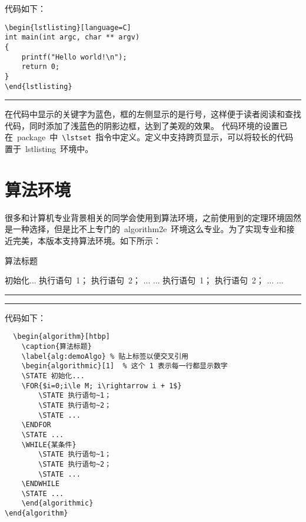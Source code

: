 \noindent 代码如下：
\begin{verbatim}
\begin{lstlisting}[language=C]
int main(int argc, char ** argv)
{
	printf("Hello world!\n");
	return 0;
}
\end{lstlisting}
\end{verbatim}
\noindent\hrule\vspace{1em}

在代码中显示的关键字为蓝色，框的左侧显示的是行号，这样便于读者阅读和查找代码，同时添加了浅蓝色的阴影边框，达到了美观的效果。
代码环境的设置已在~package~中~\verb|\lstset|~指令中定义。定义中支持跨页显示，可以将较长的代码置于~lstlisting~环境中。
\section{算法环境}
很多和计算机专业背景相关的同学会使用到算法环境，之前使用到的定理环境固然是一种选择，但是比不上专门的~algorithm2e~环境这么专业。为了实现专业和接近完美，本版本支持算法环境。如下所示：
\begin{algorithm}[htbp]
    \caption{算法标题}
    \label{alg:demoAlgo} %
    \begin{algorithmic}[1]  %
    \STATE 初始化...
        \STATE 执行语句~1；
        \STATE 执行语句~2；
        \STATE ...
    \ENDFOR
    \STATE ...
        \STATE 执行语句~1；
        \STATE 执行语句~2；
        \STATE ...
    \ENDWHILE
    \STATE ...
    \end{algorithmic}
\end{algorithm}
\noindent\hrule
\vspace{0.1em}\noindent\hrule

\vspace{1em}

\noindent 代码如下：
\begin{verbatim}
  \begin{algorithm}[htbp]
    \caption{算法标题}
    \label{alg:demoAlgo} % 贴上标签以便交叉引用
    \begin{algorithmic}[1]  % 这个 1 表示每一行都显示数字
    \STATE 初始化...
    \FOR{$i=0;i\le M; i\rightarrow i + 1$}
        \STATE 执行语句~1；
        \STATE 执行语句~2；
        \STATE ...
    \ENDFOR
    \STATE ...
    \WHILE{某条件}
        \STATE 执行语句~1；
        \STATE 执行语句~2；
        \STATE ...
    \ENDWHILE
    \STATE ...
    \end{algorithmic}
\end{algorithm}
\end{verbatim}

